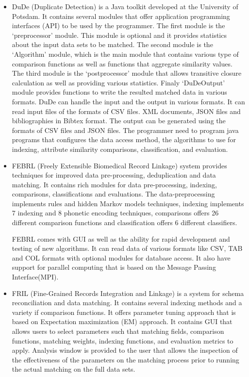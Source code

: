 \begin{itemize}
\item DuDe\cite{DrNa10} (Duplicate Detection) is a Java toolkit developed at the University of Potsdam. It contains several modules that offer application programming interfaces (API) to be used by the programmer. The first module is the ‘preprocessor’ module. This module is optional and it provides statistics about the input data sets to be matched. The second module is the ‘Algorithm’ module, which is the main module that contains various type of comparison functions as well as functions that aggregate similarity values. The third module is the ‘postprocessor’ module that allows transitive closure calculation as well as providing various statistics. Finaly ‘DuDeOutput’ module provides functions to write the resulted matched data in various formats.
DuDe can handle the input and the output in various formats. It can read input files of the formats of CSV files. XML documents, JSON files and bibliographies in Bibtex format. The output can be generated using the formats of CSV files and JSON files.
The programmer need to program java programs that configures the data access method, the algorithms to use for indexing, attribute similarity comparisons, classification, and evaluation.

\item FEBRL\cite{Chri08} (Freely Extensible Biomedical Record Linkage) system provides techniques for improved data pre-processing, deduplication and data matching. It contains rich modules for data pre-processing, indexing, comparisons, classifications and evaluations. The data-preprocessing implements rules and hidden Markov models techniques, indexing implements 7 indexing and 8 phonetic encoding techniques, comparisons offers 26 different comparison functions and classification offers 6 different classifiers.

FEBRL comes with GUI as well as the ability for rapid development and testing of new algorithms. It can read data of various formats like CSV, TAB and COL formats with optional modules for database access. It also have support for parallel computing that is based on the Message Passing Interface(MPI).

\item FRIL\cite{JLX*08} (Fine-Grained Records Integration and Linkage) is a system for schema reconciliation and data matching. It contains several indexing methods and a variety if comparison functions. It offers parameter tuning approach that is based on Expectation maximization (EM) approach. It contains GUI that allows users to select parameters such that matching fields, comparison functions, matching weights, indexing functions, and evaluation metrics to apply. Analysis window is provided to the user that allows the inspection of the effectiveness of the parameters on the matching process prior to running the actual matching on the full data sets.
 

\end{itemize}
